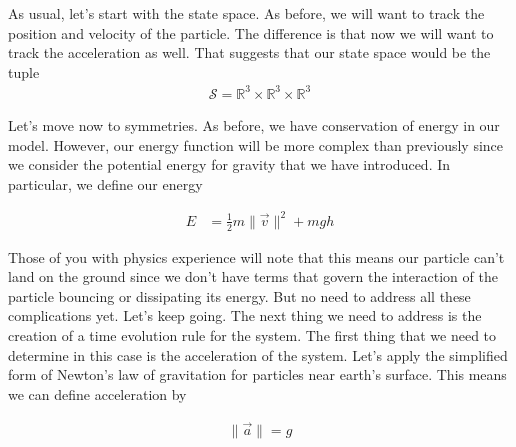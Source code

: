 \documentclass[book.tex]{subfiles}
\begin{document}
As usual, let's start with the state space. As before, we will want to track the position and velocity of the particle. The difference is that now we will want to track the acceleration as well. That suggests that our state space would be the tuple
\begin{align}
    \mathcal{S} =\mathbb{R}^3 \times \mathbb{R}^3 \times \mathbb{R}^3
\end{align}

Let's move now to symmetries. As before, we have conservation of energy in our model. However, our energy function will be more complex than previously since we consider the potential energy for gravity that we have introduced. In particular, we define our energy

\begin{align}
    E &= \frac{1}{2}m\|\vec{v}\|^2 + mgh
\end{align}

Those of you with physics experience will note that this means our particle can't land on the ground since we don't have terms that govern the interaction of the particle bouncing or dissipating its energy. But no need to address all these complications yet. Let's keep going. The next thing we need to address is the creation of a time evolution rule for the system. The first thing that we need to determine in this case is the acceleration of the system. Let's apply the simplified form of Newton's law of gravitation for particles near earth's surface. This means we can define acceleration by

\begin{align}
    \|\vec{a}\| = g
\end{align}
\end{document}
